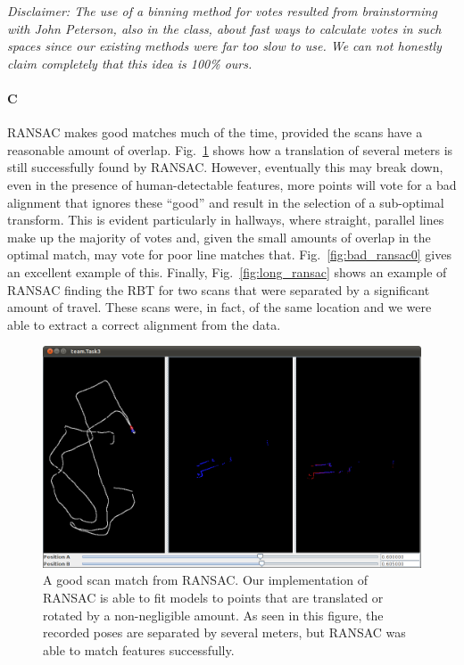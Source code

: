 \documentclass[12pt]{article}
\begin{document}
\emph{Disclaimer: The use of a binning method for votes resulted from brainstorming with John Peterson,
    also in the class, about fast ways to calculate votes in such spaces since our existing methods
    were far too slow to use. We can not honestly claim completely that this idea is 100\% ours.}

\paragraph{C}
RANSAC makes good matches much of the time, provided the scans have a reasonable
amount of overlap. Fig.~\ref{fig:good_ransac0} shows how a translation of several
meters is still successfully found by RANSAC. However, eventually this may break
down, even in the presence of human-detectable features, more points will vote
for a bad alignment that ignores these ``good'' and result in the selection of
a sub-optimal transform. This is evident particularly in hallways, where straight,
parallel lines make up the majority of votes and, given the small amounts of overlap in
the optimal match, may vote for poor line matches that. Fig.~\ref{fig:bad_ransac0} gives
an excellent example of this. Finally, Fig.~\ref{fig:long_ransac} shows an example of
RANSAC finding the RBT for two scans that were separated by a significant amount
of travel. These scans were, in fact, of the same location and we were able to extract
a correct alignment from the data.

\begin{figure}[h!]
\centering
\includegraphics[width=.7\textwidth]{figures/Task3_good0.png}
\caption{A good scan match from RANSAC. Our implementation of RANSAC is able
to fit models to points that are translated or rotated by a non-negligible amount. As seen
in this figure, the recorded poses are separated by several meters, but RANSAC
was able to match features successfully.}
\label{fig:good_ransac0}
\end{figure}
\end{document}
